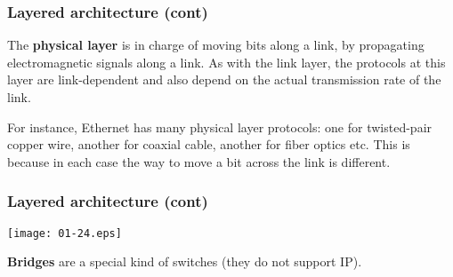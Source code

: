%
\begin{frame}
\frametitle{Layered architecture (cont)}

The \textbf{physical layer} is in charge of moving bits along a link,
by propagating electromagnetic signals along a link. As with the link
layer, the protocols at this layer are link-dependent and also depend
on the actual transmission rate of the link.

\bigskip

For instance, Ethernet has many physical layer protocols: one for
twisted-pair copper wire, another for coaxial cable, another for fiber
optics etc. This is because in each case the way to move a bit across
the link is different.

\end{frame}

%
\begin{frame}
\frametitle{Layered architecture (cont)}

\begin{center}
\texttt{[image: 01-24.eps]}
\end{center}
\textbf{Bridges} are a special kind of switches (they do not support IP).

\end{frame}
